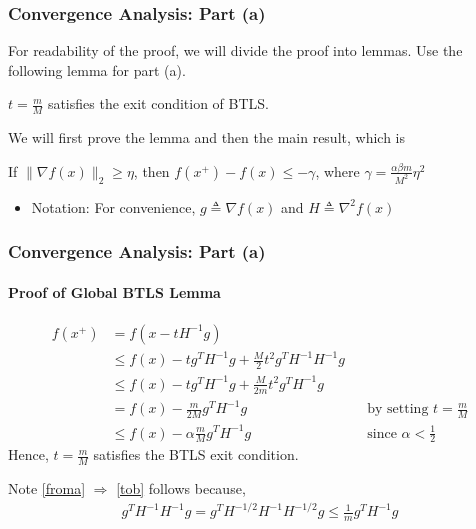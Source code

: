 \documentclass{beamer}
\begin{document}
\begin{frame}
    \frametitle{Convergence Analysis: Part (a)}    
    For readability of the proof, we will divide the proof into lemmas. Use the following lemma for part (a).
    
    \begin{lemma}
        $t = \frac{m}{M}$ satisfies the exit condition of BTLS.
    \end{lemma}
    
    We will first prove the lemma and then the main result, which is 
    \begin{Theorem}[Part (a)]
        If $\|\nabla f(x)\|_2 \geq \eta$, 
        then $f(x^{+}) - f(x) \leq -\gamma$, 
        where  $\gamma = \frac{\alpha \beta m}{M^2}\eta^2$
    \end{Theorem}
    
    \begin{itemize}
    \item Notation: For convenience, $g\triangleq \nabla f(x)$ and $H\triangleq \nabla^2f(x)$
    \end{itemize}
    
\end{frame}

\begin{frame}
    \frametitle{Convergence Analysis: Part (a)}    
    \framesubtitle{Proof of Global BTLS Lemma}
    \begin{align}
        f(x^{+}) & = f(x-tH^{-1}g) \nonumber \\
        & \le f(x) - tg^TH^{-1}g + \frac{M}{2}t^2g^TH^{-1}H^{-1}g \label{froma} \\
        & \le f(x) - tg^TH^{-1}g + \frac{M}{2m}t^2 g^T H^{-1}g \label{tob}\\
        & = f(x) -  \frac{m}{2M} g^T H^{-1}g  &&
        \text{by setting $t=\frac{m}{M}$} \nonumber \\
        & \le f(x) - \alpha \frac{m}{M} g^T H^{-1}g && \text{since }\alpha <
        \frac{1}{2} \nonumber
    \end{align}
Hence, $t = \frac{m}{M}$ satisfies the BTLS exit condition.

Note \eqref{froma} $\Rightarrow$ \eqref{tob} follows because,
\begin{align}
g^TH^{-1}H^{-1}g = g^TH^{-1/2}H^{-1}H^{-1/2}g \le \frac{1}{m} g^T H^{-1}g \nonumber
\end{align}
\end{frame}
\end{document}
